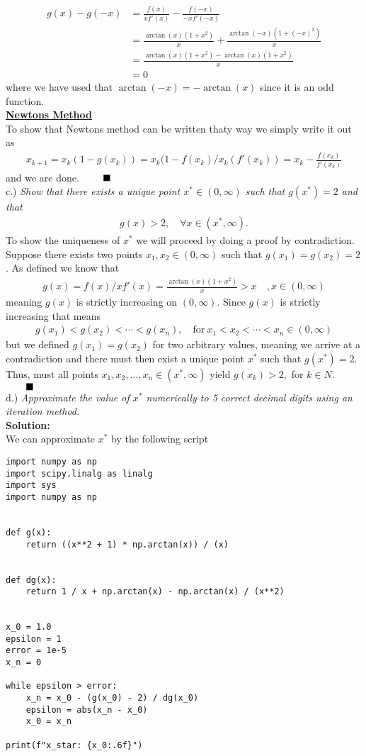 \documentclass[12pt,
               a4paper,
               article,
               oneside,
               norsk,oldfontcommands]{memoir}
\newcommand{\Q}{ \qquad \hfill \blacksquare}
\newcommand{\spaze}{\vspace{4mm}\\}
\begin{document}
\begin{align*}
g(x) - g(-x) &= \frac{f(x)}{x f'(x)} - \frac{f(-x)}{-x f'(-x)} \\[5pt]
&= \frac{\arctan(x)(1 + x^2)}{x} + \frac{\arctan(-x) (1 + (-x)^2)}{x} \\[5pt]
&= \frac{\arctan(x)(1 + x^2) - \arctan(x)(1+x^2)}{x} \\[5pt]
&= 0
\end{align*}
where we have used that $\arctan(-x) = - \arctan(x)$ since it is an odd function. \spaze 
\underline{\textbf{Newtons Method}}\spaze 
To show that Newtons method can be written thaty way we simply write it out as 
\begin{align*}
x_{k+1} = x_k( 1 - g(x_k)) = x_k(1 - f(x_k)/x_k(f'(x_k)) = x_k - \frac{f(x_k)}{f'(x_k)}
\end{align*}
and we are done. $\Q$ \spaze 
c.) \emph{Show that there exists a unique point $x^{*} \in (0, \infty)$ such that $g(x^{*}) = 2$ and that}
\begin{align*}
g(x) > 2, \quad \forall x \in (x^{*}, \infty).
\end{align*}
To show the uniqueness of $x^{*}$ we will proceed by doing a proof by contradiction. \\ Suppose there exists two points $x_1, x_2 \in (0, \infty)$ such that $g(x_1) = g(x_2) = 2$. As defined we know that 
\begin{align*}
g(x) = f(x)/ xf'(x) = \frac{\arctan(x)(1+ x^2) }{x}  > x \quad,  x \in (0, \infty)
\end{align*}
meaning $g(x)$ is strictly increasing on $(0, \infty)$. Since $g(x)$ is strictly increasing that means 
\begin{align*}
g(x_1) < g(x_2) < \cdots < g(x_n), \quad \text{for} \ x_1 < x_2 < \cdots < x_n \in (0, \infty)
\end{align*}
but we defined $g(x_1) = g(x_2)$ for two arbitrary values, meaning we arrive at a contradiction and there must then exist a unique point $x^{*}$ such that $g(x^{*}) =2$. Thus, must all points $x_1, x_2, \ldots, x_n \in (x^{*}, \infty)$ yield $g(x_k) > 2,$ for $k \in{N}$. $\Q$ \spaze 
d.) \emph{Approximate the value of $x^{*}$ numerically to 5 correct decimal digits using an iteration method.} \spaze 
\textbf{Solution:} \spaze 
We can approximate $x^{*}$ by the following script 
\begin{lstlisting}
import numpy as np
import scipy.linalg as linalg
import sys
import numpy as np


def g(x):
    return ((x**2 + 1) * np.arctan(x)) / (x)


def dg(x):
    return 1 / x + np.arctan(x) - np.arctan(x) / (x**2)


x_0 = 1.0
epsilon = 1
error = 1e-5
x_n = 0

while epsilon > error:
    x_n = x_0 - (g(x_0) - 2) / dg(x_0)
    epsilon = abs(x_n - x_0)
    x_0 = x_n
    
print(f"x_star: {x_0:.6f}")
\end{lstlisting}
\end{document}
